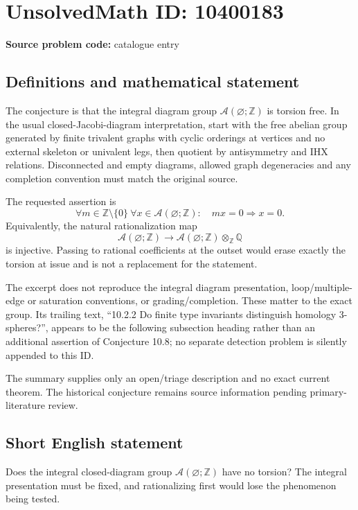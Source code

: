 \documentclass[11pt]{article}
\begin{document}
\section*{UnsolvedMath ID: 10400183}
\textbf{Source problem code:} catalogue entry
\subsection{Definitions and mathematical statement}
The conjecture is that the integral diagram group \(\mathcal A(\varnothing;\mathbb Z)\) is torsion free. In the usual closed-Jacobi-diagram interpretation, start with the free abelian group generated by finite trivalent graphs with cyclic orderings at vertices and no external skeleton or univalent legs, then quotient by antisymmetry and IHX relations. Disconnected and empty diagrams, allowed graph degeneracies and any completion convention must match the original source.

The requested assertion is
\[
 \forall m\in\mathbb Z\setminus\{0\}\ \forall x\in\mathcal A(\varnothing;\mathbb Z):
 \quad mx=0\Longrightarrow x=0.
\]
Equivalently, the natural rationalization map
\[
 \mathcal A(\varnothing;\mathbb Z)\longrightarrow
 \mathcal A(\varnothing;\mathbb Z)\otimes_{\mathbb Z}\mathbb Q
\]
is injective. Passing to rational coefficients at the outset would erase exactly the torsion at issue and is not a replacement for the statement.

The excerpt does not reproduce the integral diagram presentation, loop/multiple-edge or saturation conventions, or grading/completion. These matter to the exact group. Its trailing text, ``10.2.2 Do finite type invariants distinguish homology 3-spheres?'', appears to be the following subsection heading rather than an additional assertion of Conjecture 10.8; no separate detection problem is silently appended to this ID.

The summary supplies only an open/triage description and no exact current theorem. The historical conjecture remains source information pending primary-literature review.
\subsection{Short English statement}
Does the integral closed-diagram group \(\mathcal A(\varnothing;\mathbb Z)\) have no torsion? The integral presentation must be fixed, and rationalizing first would lose the phenomenon being tested.
\end{document}
